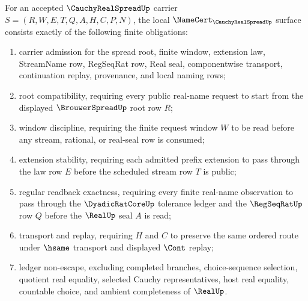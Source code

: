 \begin{theorem}
\label{thm:cauchy-real-spread-namecert-obligations}
For an accepted $\CauchyRealSpreadUp$ carrier $S=(R,W,E,T,Q,A,H,C,P,N)$, the local $\NameCert_{\CauchyRealSpreadUp}$ surface consists exactly of the following finite obligations:
\begin{enumerate}
\item carrier admission for the spread root, finite window, extension law, StreamName row, RegSeqRat row, Real seal, componentwise transport, continuation replay, provenance, and local naming rows;
\item root compatibility, requiring every public real-name request to start from the displayed $\BrouwerSpreadUp$ root row $R$;
\item window discipline, requiring the finite request window $W$ to be read before any stream, rational, or real-seal row is consumed;
\item extension stability, requiring each admitted prefix extension to pass through the law row $E$ before the scheduled stream row $T$ is public;
\item regular readback exactness, requiring every finite real-name observation to pass through the $\DyadicRatCoreUp$ tolerance ledger and the $\RegSeqRatUp$ row $Q$ before the $\RealUp$ seal $A$ is read;
\item transport and replay, requiring $H$ and $C$ to preserve the same ordered route under $\hsame$ transport and displayed $\Cont$ replay;
\item ledger non-escape, excluding completed branches, choice-sequence selection, quotient real equality, selected Cauchy representatives, host real equality, countable choice, and ambient completeness of $\RealUp$.
\end{enumerate}
\end{theorem}
